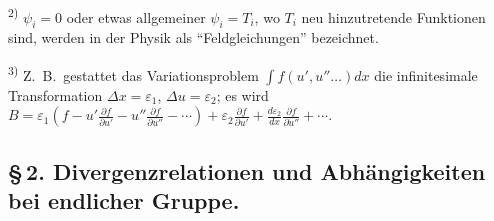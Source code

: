 \documentclass[12pt,a4paper]{article}
\begin{document}
\smallskip
\noindent\textsuperscript{2)} $\psi_{i}=0$ oder etwas allgemeiner $\psi_{i}=T_{i}$, wo $T_{i}$ neu hinzutretende Funktionen sind, werden in der Physik als ``Feldgleichungen'' bezeichnet.

\smallskip
\noindent\textsuperscript{3)} Z.\ B.\ gestattet das Variationsproblem $\int f(u',u''\ldots)dx$ die infinitesimale Transformation $\Delta x=\varepsilon_{1}$, $\Delta u=\varepsilon_{2}$; es wird $B=\varepsilon_{1}(f-u'\frac{\partial f}{\partial u'}-u''\frac{\partial f}{\partial u''}-\cdots)+\varepsilon_{2}\frac{\partial f}{\partial u'}+\frac{d\varepsilon_{2}}{dx}\frac{\partial f}{\partial u''}+\cdots$.

\subsection*{\S\,2. Divergenzrelationen und Abh\"angigkeiten bei endlicher Gruppe.}
\end{document}
